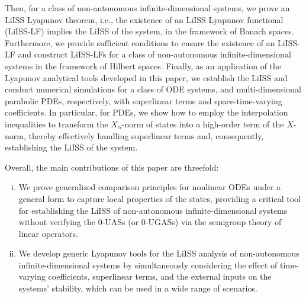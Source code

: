 \documentclass[onecolumn]{autart}
\newenvironment{proof of Prop.ODE}{{\it Proof of Proposition~\ref{Prop.ODE}:\enspace}}{\hfill $\blacksquare$\par}
\newenvironment{proof of PDE}{{\it Proof of Proposition \ref{Prop.8}:\enspace}}{\hfill $\blacksquare$\par}
\begin{document}
{		%
	Then, for a class of non-autonomous infinite-dimensional systems, we  prove an LiISS Lyapunov theorem, i.e., the existence of an  LiISS Lyapunov functional (LiISS-LF) implies the LiISS of the system, in the framework of Banach spaces. Furthermore, we provide sufficient conditions to ensure the existence of an LiISS-LF and construct LiISS-LFs for a class of non-autonomous infinite-dimensional systems in the framework of Hilbert spaces. Finally, as an application of the Lyapunov analytical tools developed in this paper, we establish the LiISS and conduct numerical simulations for a class of ODE systems, and multi-dimensional parabolic PDEs, respectively,  with superlinear terms and space-time-varying coefficients. In particular,  for PDEs, we show how to employ the  interpolation inequalities    to      {transform the  $X_{\alpha}$-norm of  states into a high-order term of the $X$-norm, thereby effectively handling superlinear terms and, consequently, establishing the LiISS   of   the {system}.}
	
	
	Overall, the main contributions of this paper are threefold:
	\begin{enumerate}[(i)]
		\item   We  prove  generalized comparison principles for nonlinear ODEs under a general form to capture local  properties of the states,  providing a  critical   tool for establishing   the LiISS of non-autonomous infinite-dimensional systems without verifying the {0-UASs (or 0-UGASs)} via  the semigroup theory of linear operators.
		\item   {We develop generic  Lyapunov   tools for    the LiISS  analysis of  non-autonomous infinite-dimensional systems by simultaneously considering  the effect of  time-varying coefficients, superlinear terms, and the external inputs on the systems' stability,  which can be used in a wide range of scenarios.}
		

\end{enumerate}}
\end{document}
